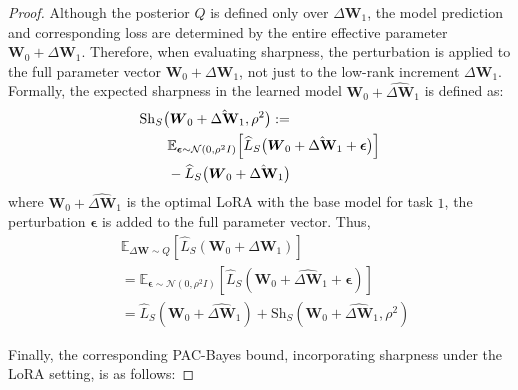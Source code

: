 \documentclass[letterpaper]{article} %
\begin{document}
\begin{proof}
Although the posterior $Q$ is defined only over $\Delta\boldsymbol{W}_1$, the model prediction and corresponding loss are determined by the entire effective parameter $\boldsymbol{W}_0 + \Delta\boldsymbol{W}_1$. Therefore, when evaluating sharpness, the perturbation is applied to the full parameter vector $\boldsymbol{W}_0 + \Delta\boldsymbol{W}_1$, not just to the low-rank increment $\Delta\boldsymbol{W}_1$. Formally, the expected sharpness in the learned model $\boldsymbol{W}_0 + \hat{\Delta\boldsymbol{W}}_1$ is defined as:
\begin{equation}
\begin{aligned}
&\mathrm{Sh}_S\big(\boldsymbol{W}_0 + \hat{\Delta\mathbf{W}}_1, \rho^2\big) := \\
& \qquad \mathbb{E}_{\boldsymbol{\epsilon} \sim \mathcal{N}(0, \rho^2 I)} \Big[
    \widehat{L}_S\big(\boldsymbol{W}_0 + \hat{\Delta\mathbf{W}}_1 + \boldsymbol{\epsilon}\big)
\Big]  \\
& \qquad- \widehat{L}_S\big(\boldsymbol{W}_0 + \hat{\Delta\mathbf{W}}_1\big) 
\notag
\end{aligned}
\end{equation}
where $\boldsymbol{W}_0 +\hat{\Delta\boldsymbol{W}}_1$ is the optimal LoRA with the base model for task $1$, the perturbation $\boldsymbol{\epsilon}$ is added to the full parameter vector. Thus,
\begin{equation}
    \begin{aligned}
    &\mathbb{E}_{\Delta\mathbf{W} \sim Q}[\widehat{L}_S(\mathbf{W}_0 + \Delta\mathbf{W}_1)] \\
    &= \mathbb{E}_{\boldsymbol{\epsilon} \sim \mathcal{N}(0, \rho^2 I)}[\widehat{L}_S(\mathbf{W}_0 + \hat{\Delta\mathbf{W}}_1 + \boldsymbol{\epsilon})]  \\
    &=\widehat{L}_S(\mathbf{W}_0 + \hat{\Delta\mathbf{W}}_1) + \mathrm{Sh}_S(\mathbf{W}_0+\hat{\Delta\mathbf{W}}_1, \rho^2)
\end{aligned}
\end{equation}


Finally, the corresponding PAC-Bayes bound, incorporating sharpness under the LoRA setting, is as follows:



\end{proof}
\end{document}
